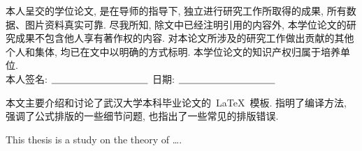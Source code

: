 {%

本人呈交的学位论文, 是在导师的指导下, 独立进行研究工作所取得的成果,
所有数据、图片资料真实可靠. 尽我所知, 除文中已经注明引用的内容外,
本学位论文的研究成果不包含他人享有著作权的内容.
对本论文所涉及的研究工作做出贡献的其他个人和集体,
均已在文中以明确的方式标明. 本学位论文的知识产权归属于培养单位.\\[2cm]

\hspace*{1cm}本人签名: $\underline{\hspace{3.5cm}}$
\hspace{2cm}日期: $\underline{\hspace{3.5cm}}$\hfill\par}
\baselineskip=23pt  %





\begin{cnabstract}
本文主要介绍和讨论了武汉大学本科毕业论文的~\LaTeX~模板.
指明了编译方法, 强调了公式排版的一些细节问题, 也指出了一些常见的排版错误.



\end{cnabstract}
\par
\vspace*{2em}






\begin{enabstract}
This thesis is a study on the theory of \dots.

\end{enabstract}
\par
\vspace*{2em}

 \enkeywords{\LaTeX{};  }
